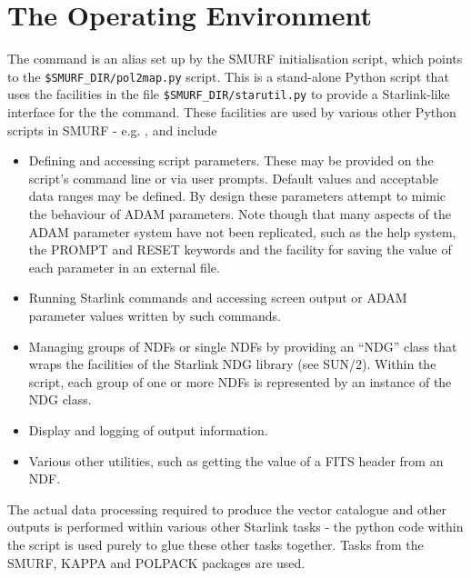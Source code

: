 \documentclass[twoside,11pt]{starlink}
\begin{document}
\section{The \ptmap Operating Environment}
The \ptmap command is an alias set up by the SMURF
initialisation script, which points to the \texttt{\$SMURF\_DIR/pol2map.py}
script. This is a stand-alone Python script that uses the facilities in
the file \texttt{\$SMURF\_DIR/starutil.py} to provide a Starlink-like
interface for the the \ptmap command. These facilities are used
by various other Python scripts in SMURF - e.g. \sloop, and include
\begin{itemize}
\item Defining and accessing script parameters. These may be provided on the
script's command line or via user prompts. Default values and acceptable
data ranges may be defined. By design these parameters attempt to mimic the
behaviour of ADAM parameters. Note though that many aspects of the ADAM parameter
system have not been replicated, such as the help system, the PROMPT and RESET
keywords and the facility for saving the value of each parameter in an external
file.
\item Running Starlink commands and accessing screen output or ADAM
parameter values written by such commands.
\item Managing groups of NDFs or single NDFs by providing an ``NDG'' class
that wraps the facilities of the Starlink NDG library (see SUN/2). Within the
\ptmap script, each group of one or more NDFs is represented by an
instance of the NDG class.
\item Display and logging of output information.
\item Various other utilities, such as getting the value of a FITS
header from an NDF.
\end{itemize}
The actual data processing required to produce the vector catalogue and
other outputs is performed within various other Starlink tasks - the
python code within the \ptmap script is used purely to glue these
other tasks together. Tasks from the SMURF, KAPPA and POLPACK packages
are used.
\end{document}
